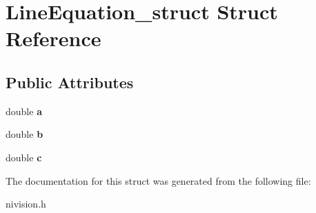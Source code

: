 \hypertarget{structLineEquation__struct}{\section{\-Line\-Equation\-\_\-struct \-Struct \-Reference}
\label{structLineEquation__struct}
}
\subsection*{\-Public \-Attributes}
\begin{DoxyCompactItemize}
\item 
\hypertarget{structLineEquation__struct_af907cdec4d74ce48da6dc12ef2eaf6f1}{double {\bfseries a}}\label{structLineEquation__struct_af907cdec4d74ce48da6dc12ef2eaf6f1}

\item 
\hypertarget{structLineEquation__struct_a77e5a167b0d9b9845e8597f7c170490b}{double {\bfseries b}}\label{structLineEquation__struct_a77e5a167b0d9b9845e8597f7c170490b}

\item 
\hypertarget{structLineEquation__struct_aa8cfcd2ce253fd5579bc4e7d054c93e5}{double {\bfseries c}}\label{structLineEquation__struct_aa8cfcd2ce253fd5579bc4e7d054c93e5}

\end{DoxyCompactItemize}


\-The documentation for this struct was generated from the following file\-:\begin{DoxyCompactItemize}
\item 
nivision.\-h\end{DoxyCompactItemize}
